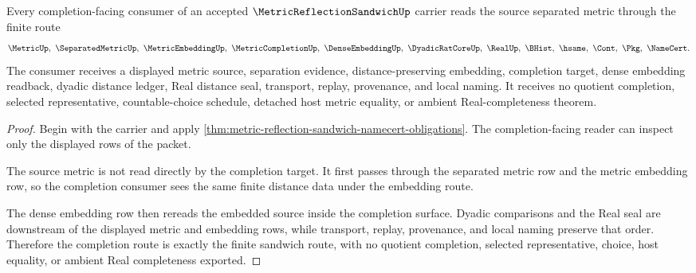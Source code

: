 \begin{theorem}
\label{thm:metric-reflection-sandwich-completion-route}
Every completion-facing consumer of an accepted $\MetricReflectionSandwichUp$ carrier reads the source separated metric through the finite route
$$
\MetricUp,\ \SeparatedMetricUp,\ \MetricEmbeddingUp,\ \MetricCompletionUp,\ \DenseEmbeddingUp,\ \DyadicRatCoreUp,\ \RealUp,\ \BHist,\ \hsame,\ \Cont,\ \Pkg,\ \NameCert .
$$
The consumer receives a displayed metric source, separation evidence, distance-preserving embedding, completion target, dense embedding readback, dyadic distance ledger, Real distance seal, transport, replay, provenance, and local naming. It receives no quotient completion, selected representative, countable-choice schedule, detached host metric equality, or ambient Real-completeness theorem.
\end{theorem}
\begin{proof}
Begin with the carrier and apply \autoref{thm:metric-reflection-sandwich-namecert-obligations}. The completion-facing reader can inspect only the displayed rows of the packet.

The source metric is not read directly by the completion target. It first passes through the separated metric row and the metric embedding row, so the completion consumer sees the same finite distance data under the embedding route.

The dense embedding row then rereads the embedded source inside the completion surface. Dyadic comparisons and the Real seal are downstream of the displayed metric and embedding rows, while transport, replay, provenance, and local naming preserve that order. Therefore the completion route is exactly the finite sandwich route, with no quotient completion, selected representative, choice, host equality, or ambient Real completeness exported.
\end{proof}



